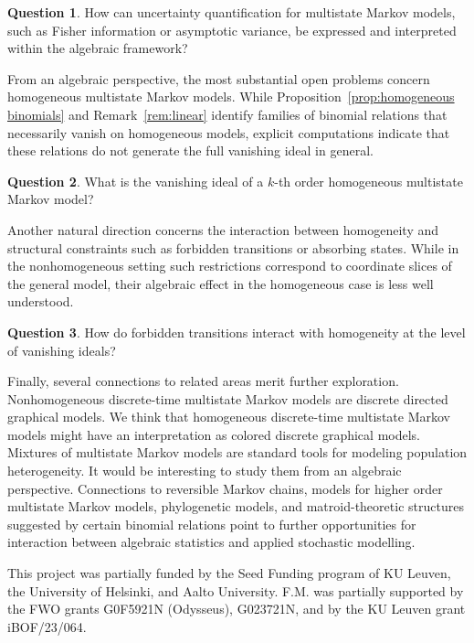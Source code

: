 \documentclass[11pt, a4paper]{article}
\numberwithin{equation}{section}
\theoremstyle{plain}
\theoremstyle{definition}
\newtheorem{question}{Question}
\begin{document}
\begin{question}
How can uncertainty quantification for multistate Markov models, such as Fisher information
or asymptotic variance, be expressed and interpreted within the algebraic framework?
\end{question}

From an algebraic perspective, the most substantial open problems concern homogeneous
multistate Markov models.
While Proposition~\ref{prop:homogeneous binomials} and Remark~\ref{rem:linear} identify
families of binomial relations that necessarily vanish on homogeneous models, explicit
computations indicate that these relations do not generate the full vanishing ideal in
general.

\begin{question}
What is the vanishing ideal of a $k$-th order homogeneous multistate Markov model?
\end{question}


Another natural direction concerns the interaction between homogeneity and structural
constraints such as forbidden transitions or absorbing states.
While in the nonhomogeneous setting such restrictions correspond to coordinate slices of the
general model, their algebraic effect in the homogeneous case is less well understood.

\begin{question}
How do forbidden transitions interact with homogeneity at the level of vanishing ideals?
\end{question}


Finally, several connections to related areas merit further exploration. 
Nonhomogeneous discrete-time multistate Markov models are discrete directed graphical models. We think that homogeneous discrete-time multistate Markov models might have an interpretation as colored discrete graphical models.
Mixtures of 
multistate Markov models are standard tools for modeling population heterogeneity. It would be interesting to study them from an algebraic perspective. 
Connections to reversible Markov chains, models for higher order multistate Markov models, phylogenetic models, and matroid-theoretic structures
suggested by certain binomial relations point to further opportunities for interaction
between algebraic statistics and applied stochastic modelling.







This project was partially funded by the Seed Funding program of KU Leuven, the University of Helsinki, and Aalto University. F.M. was partially supported by the FWO grants G0F5921N (Odysseus), G023721N, and by the KU Leuven grant iBOF/23/064. 
\end{document}
